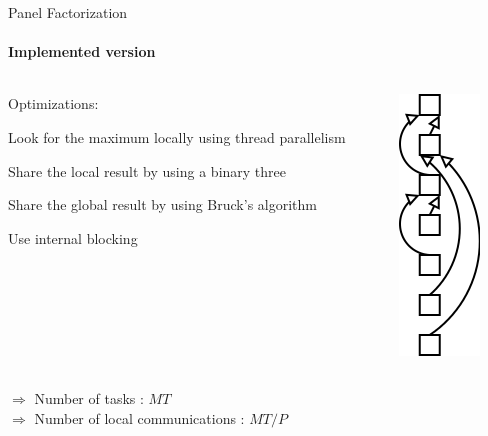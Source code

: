 \documentclass{beamer}
\begin{document}
\begin{frame}{Panel Factorization}
\framesubtitle{Implemented version}
\begin{columns}
\begin{column}{.70\textwidth}
Optimizations:
\begin{itemize}
{
\item Look for the maximum locally using thread parallelism}
\item Share the local result by using a binary three
\item Share the global result by using Bruck's algorithm
\item Use internal blocking
\end{itemize}
\end{column}
\hfill
\begin{column}{.30\textwidth}
\begin{center}
\includegraphics[scale=0.6]{binary_reduction.png}
\end{center}
\end{column}
\end{columns}
\pause
\begin{exampleblock}{}
$\Longrightarrow$ Number of tasks : $MT$\\
$\Longrightarrow$ Number of local communications : $MT/P$
\end{exampleblock}{}
\end{frame}
\end{document}
